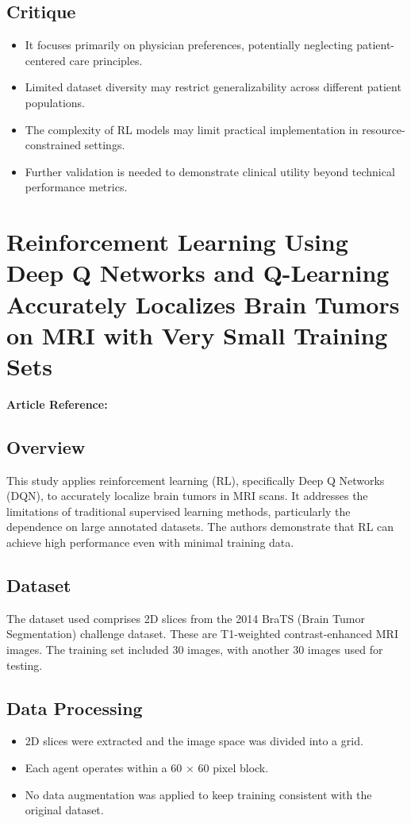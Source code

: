\subsection*{Critique}
\begin{itemize}
    \item It focuses primarily on physician preferences, potentially neglecting patient-centered care principles.
    \item Limited dataset diversity may restrict generalizability across different patient populations.
    \item The complexity of RL models may limit practical implementation in resource-constrained settings.
    \item Further validation is needed to demonstrate clinical utility beyond technical performance metrics.
\end{itemize}


\section{Reinforcement Learning Using Deep Q Networks and Q-Learning Accurately Localizes Brain Tumors on MRI with Very Small Training Sets}
\textbf{Article Reference:} \cite{stemberReinforcementLearningUsing2022}

\subsection*{Overview}
This study applies reinforcement learning (RL), specifically Deep Q Networks (DQN), to accurately localize brain tumors in MRI scans. It addresses the limitations of traditional supervised learning methods, particularly the dependence on large annotated datasets. The authors demonstrate that RL can achieve high performance even with minimal training data.

\subsection*{Dataset}
The dataset used comprises 2D slices from the 2014 BraTS (Brain Tumor Segmentation) challenge dataset. These are T1-weighted contrast-enhanced MRI images. The training set included 30 images, with another 30 images used for testing.

\subsection*{Data Processing}
\begin{itemize}
    \item 2D slices were extracted and the image space was divided into a grid.
    \item Each agent operates within a 60 × 60 pixel block.
    \item No data augmentation was applied to keep training consistent with the original dataset.
\end{itemize}

